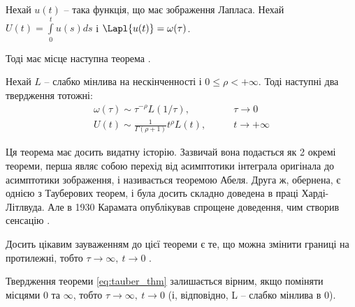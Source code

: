 Нехай $u(t)$ – така функція, що має зображення Лапласа. Нехай $U(t)=\int\limits_0^t u(s) ds$ і $\Lapl{u(t)}=\omega(\tau)$.

Тоді має місце наступна теорема \cite[~ст. 445]{Feller}.

\begin{thm}
	\label{eq:tauber_thm}
	Нехай $L$ – слабко мінлива на нескінченності і $0 ≤ \rho < +\infty$. Тоді наступні два твердження тотожні:
	\begin{align}
		\omega(\tau) \sim \tau^{-\rho} L(1/\tau),\qquad &\tau \rightarrow 0 \\
		U(t) \sim \frac{1}{\Gamma(\rho + 1)} t^{\rho} L(t),\qquad &t \rightarrow +\infty
	\end{align}
\end{thm}

Ця теорема має досить видатну історію. Зазвичай вона подається як 2 окремі теореми, перша являє собою перехід від асимптотики інтеграла оригінала до асимптотики зображення, і називається теоремою Абеля. Друга ж, обернена, є однією з Тауберових теорем, і була досить складно доведена в праці Харді-Літлвуда. Але в 1930 Карамата опублікував спрощене доведення, чим створив сенсацію \cite[~ст. 445]{Feller}.

Досить цікавим зауваженням до цієї теореми є те, що можна змінити границі на протилежні, тобто $\tau \rightarrow \infty, ~ t \rightarrow 0$ \cite[~ст. 445]{Feller}.

\begin{thm}
	\label{eq:tauber_rev_thm}
	Твердження теореми \eqref{eq:tauber_thm} залишається вірним, якщо поміняти місцями 0 та $\infty$, тобто $\tau \rightarrow \infty, ~ t \rightarrow 0$ (і, відповідно, L – слабко мінлива в 0).
\end{thm}
